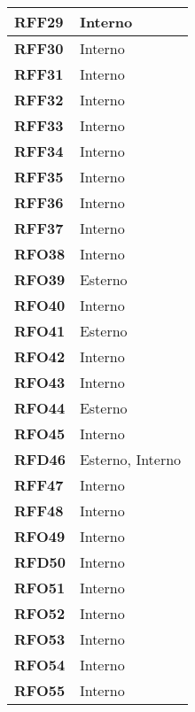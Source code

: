 \begin{longtable}{|>{\centering\arraybackslash}m{}|>{\centering\arraybackslash}m{}|}
	\textbf{RFF29} & Interno \\\hline
	\textbf{RFF30} & Interno \\\hline
	\textbf{RFF31} & Interno \\\hline
	\textbf{RFF32} & Interno \\\hline
	\textbf{RFF33} & Interno \\\hline
	\textbf{RFF34} & Interno \\\hline
	\textbf{RFF35} & Interno \\\hline
	\textbf{RFF36} & Interno \\\hline
	\textbf{RFF37} & Interno \\\hline
	\textbf{RFO38} & Interno \\\hline
	\textbf{RFO39} & Esterno \\\hline
	\textbf{RFO40} & Interno \\\hline
	\textbf{RFO41} & Esterno \\\hline
	\textbf{RFO42} & Interno \\\hline
	\textbf{RFO43} & Interno \\\hline
	\textbf{RFO44} & Esterno \\\hline
	\textbf{RFO45} & Interno \\\hline
	\textbf{RFD46} & Esterno, Interno \\\hline
	\textbf{RFF47} & Interno \\\hline
	\textbf{RFF48} & Interno \\\hline
	\textbf{RFO49} & Interno \\\hline
	\textbf{RFD50} & Interno \\\hline
	\textbf{RFO51} & Interno \\\hline
	\textbf{RFO52} & Interno \\\hline
	\textbf{RFO53} & Interno \\\hline
	\textbf{RFO54} & Interno \\\hline
	\textbf{RFO55} & Interno \\\hline
    

\end{longtable}
